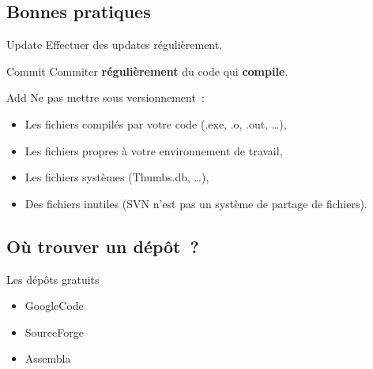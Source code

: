 \subsection{Bonnes pratiques}
\begin{frame}
  \begin{alertblock}{Update}
    Effectuer des updates régulièrement.
  \end{alertblock}
  \begin{alertblock}{Commit}
    Commiter \textbf{régulièrement} du code qui \textbf{compile}.
  \end{alertblock}
  \begin{alertblock}{Add}
    Ne pas mettre sous versionnement~:
    \begin{itemize}
    \item Les fichiers compilés par votre code (.exe, .o, .out, \ldots),
    \item Les fichiers propres à votre environnement de travail,
    \item Les fichiers systèmes (Thumbs.db, \ldots),
    \item Des fichiers inutiles (SVN n'est pas un système de partage de fichiers).
    \end{itemize}
  \end{alertblock}
\end{frame}

\subsection{Où trouver un dépôt~?}
\begin{frame}
  \begin{exampleblock}{Les dépôts gratuits}
    \begin{itemize}
    \item GoogleCode
    \item SourceForge
    \item Assembla
    \end{itemize}
  \end{exampleblock}
\end{frame}
